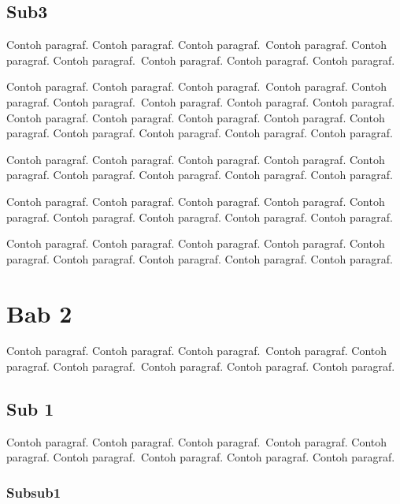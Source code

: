 \documentclass[twoside,bahasa]{tufte-book}
\begin{document}
\section{Sub3}

Contoh paragraf. Contoh paragraf. Contoh paragraf.~Contoh paragraf.
Contoh paragraf. Contoh paragraf.~Contoh paragraf. Contoh paragraf.
Contoh paragraf.

Contoh paragraf. Contoh paragraf. Contoh paragraf.~Contoh paragraf.
Contoh paragraf. Contoh paragraf.~Contoh paragraf. Contoh paragraf.
Contoh paragraf.
Contoh paragraf. Contoh paragraf. Contoh paragraf. Contoh paragraf.
Contoh paragraf. Contoh paragraf. Contoh paragraf. Contoh paragraf.
Contoh paragraf.

Contoh paragraf. Contoh paragraf. Contoh paragraf. Contoh paragraf.
Contoh paragraf. Contoh paragraf. Contoh paragraf. Contoh paragraf.
Contoh paragraf.

Contoh paragraf. Contoh paragraf. Contoh paragraf. Contoh paragraf.
Contoh paragraf. Contoh paragraf. Contoh paragraf. Contoh paragraf.
Contoh paragraf.

Contoh paragraf. Contoh paragraf. Contoh paragraf. Contoh paragraf.
Contoh paragraf. Contoh paragraf. Contoh paragraf. Contoh paragraf.
Contoh paragraf.


\chapter{Bab 2}

Contoh paragraf. Contoh paragraf. Contoh paragraf.~Contoh paragraf.
Contoh paragraf. Contoh paragraf.~Contoh paragraf. Contoh paragraf.
Contoh paragraf.

\section{Sub 1}

Contoh paragraf. Contoh paragraf. Contoh paragraf.~Contoh paragraf.
Contoh paragraf. Contoh paragraf.~Contoh paragraf. Contoh paragraf.
Contoh paragraf.

\subsection{Subsub1}
\end{document}
